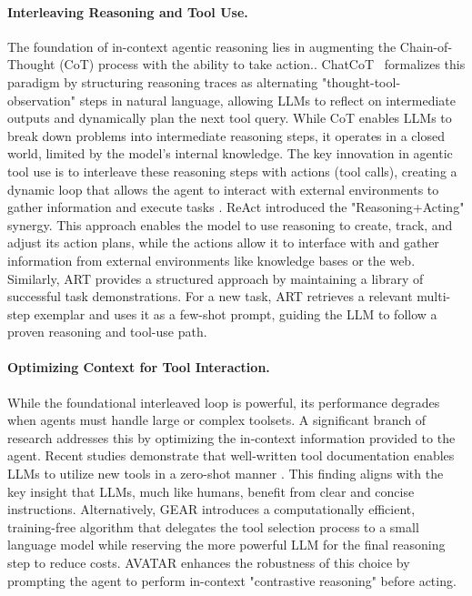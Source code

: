 \paragraph{Interleaving Reasoning and Tool Use.}
The foundation of in-context agentic reasoning lies in augmenting the Chain-of-Thought (CoT) process with the ability to take action.\citep{wei2022chain}. 
{ChatCoT}~\cite{chen-etal-2023-chatcot} formalizes this paradigm by structuring reasoning traces as alternating "thought-tool-observation" steps in natural language, allowing LLMs to reflect on intermediate outputs and dynamically plan the next tool query.
While CoT enables LLMs to break down problems into intermediate reasoning steps, it operates in a closed world, limited by the model's internal knowledge. The key innovation in agentic tool use is to interleave these reasoning steps with actions (tool calls), creating a dynamic loop that allows the agent to interact with external environments to gather information and execute tasks \citep{inaba-etal-2023-multitool,trivedi2022interleaving}. 
ReAct \cite{yao2023react} introduced the "Reasoning+Acting" synergy. This approach enables the model to use reasoning to create, track, and adjust its action plans, while the actions allow it to interface with and gather information from external environments like knowledge bases or the web. 
Similarly, ART \cite{paranjape2023artautomaticmultistepreasoning} provides a structured approach by maintaining a library of successful task demonstrations. For a new task, ART retrieves a relevant multi-step exemplar and uses it as a few-shot prompt, guiding the LLM to follow a proven reasoning and tool-use path.



\paragraph{Optimizing Context for Tool Interaction.}
While the foundational interleaved loop is powerful, its performance degrades when agents must handle large or complex toolsets. A significant branch of research addresses this by optimizing the in-context information provided to the agent. Recent studies demonstrate that well-written tool documentation enables LLMs to utilize new tools in a zero-shot manner \citep{hsieh2023tooldocumentationenableszeroshot,yuan2024easytool}. This finding aligns with the key insight that LLMs, much like humans, benefit from clear and concise instructions. Alternatively, GEAR \citep{lu-etal-2024-gear} introduces a computationally efficient, training-free algorithm that delegates the tool selection process to a small language model while reserving the more powerful LLM for the final reasoning step to reduce costs.
AVATAR \cite{NEURIPS2024_2db8ce96} enhances the robustness of this choice by prompting the agent to perform in-context "contrastive reasoning" before acting.



